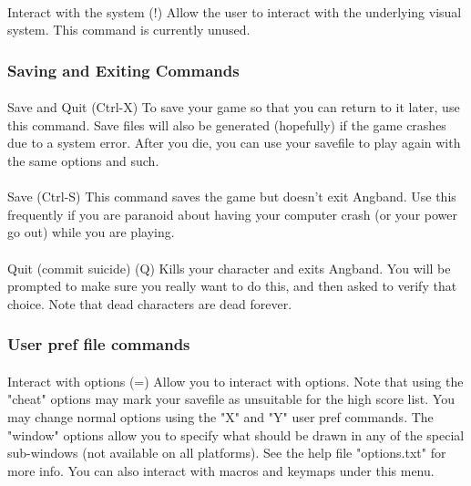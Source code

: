 \paragraph{}Interact with the system (!) Allow the user to interact with
the underlying visual system.  This command is currently unused.
 
\subsubsection{Saving and Exiting Commands} 
\paragraph{}Save and Quit
(Ctrl-X) To save your game so that you can return to it later, use this
command. Save files will also be generated (hopefully) if the game
crashes due to a system error. After you die, you can use your savefile
to play again with the same options and such.

\paragraph{}Save (Ctrl-S) This command saves the game but doesn't exit
Angband. Use this frequently if you are paranoid about having your
computer crash (or your power go out) while you are playing.

\paragraph{}Quit (commit suicide) (Q) Kills your character and exits
Angband. You will be prompted to make sure you really want to do this,
and then asked to verify that choice. Note that dead characters are dead
forever.

\subsubsection{User pref file commands}

\paragraph{}Interact with options (=) Allow you to interact with
options. Note that using the "cheat" options may mark your savefile as
unsuitable for the high score list. You may change normal options using
the "X" and "Y" user pref commands. The "window" options allow you to
specify what should be drawn in any of the special sub-windows (not
available on all platforms). See the help file "options.txt" for more
info.  You can also interact with macros and keymaps under this menu.

